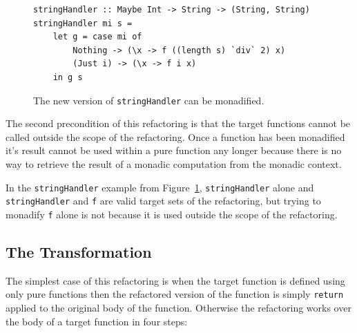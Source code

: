 \begin{figure}[t]
\begin{lstlisting}
stringHandler :: Maybe Int -> String -> (String, String)
stringHandler mi s = 
	let g = case mi of
		Nothing -> (\x -> f ((length s) `div` 2) x)
		(Just i) -> (\x -> f i x)
	in g s
\end{lstlisting}
\caption{The new version of \texttt{stringHandler} can be monadified.}
\label{etaHan}
\end{figure}

The second precondition of this refactoring is that the target functions cannot be called outside the scope of the refactoring. Once a function has been monadified it's result cannot be used within a pure function any longer because there is no way to retrieve the result of a monadic computation from the monadic context.

 In the \texttt{stringHandler} example from Figure~\ref{etaHan}, \texttt{stringHandler} alone and \texttt{stringHandler} and \texttt{f} are valid target sets of the refactoring, but trying to monadify \texttt{f} alone is not because it is used outside the scope of the refactoring. 

\subsection{The Transformation}

The simplest case of this refactoring is when the target function is defined using only pure functions then the refactored version of the function is simply \texttt{return} applied to the original body of the function. Otherwise the refactoring works over the body of a target function in four steps:

